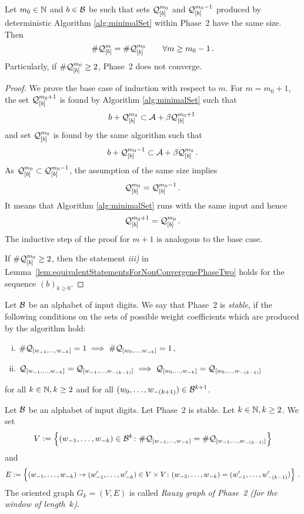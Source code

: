 \begin{thm}
\label{thm:bbbCondition}
Let $m_0 \in \NN$ and $b\in\B$ be such that sets $\Qb{m_0}$ and $\Qb{m_0-1}$ produced by deterministic Algorithm \ref{alg:minimalSet} within Phase~2 have the same size. Then
$$
    \#\Qb{m} = \#\Qb{m_0} \qquad \forall m\geq m_0-1\,.
$$ 
Particularly, if $\#\Qb{m_0}\geq 2$, Phase~2 does not converge.
\end{thm}
\begin{proof}
We prove the base case of induction with respect to $m$. For $m=m_0+1$, the set $\Qb{m_0+1}$ is found by Algorithm \ref{alg:minimalSet} such that 
$$
b + \Qb{m_0} \subset \A + \beta \Qb{m_0+1}\,
$$
and set $\Qb{m_0}$ is found by the same algorithm such that
$$
b + \Qb{m_0-1} \subset \A + \beta \Qb{m_0}\,.
$$
As $\Qb{m_0} \subset \Qb{m_0-1}$, the assumption of the same size implies
$$
    \Qb{m_0} = \Qb{m_0-1}\,.
$$
It means that Algorithm \ref{alg:minimalSet} runs with the same input and hence
$$
\Qb{m_0+1}=\Qb{m_0}\,.
$$
The inductive step of the proof for $m+1$ is analogous to the base case.

If $\#\Qb{m_0}\geq 2$, then the statement \textit{iii)} in Lemma~\ref{lem:equivalentStatementsForNonConvergenePhaseTwo} holds for the sequence $(b)_{k\geq 0}$.
\end{proof}





\begin{defn}
Let $\B$ be an alphabet of input digits. We say that Phase~2 is \emph{stable}, if the following conditions on the sets of possible weight coefficients which are produced by the algorithm hold: 
\begin{enumerate}[i)]
	\item $\#\Qw{1}{k}=1 \implies \#\Qwo{k}=1$,
	\item $\Qw{1}{k}=\Qw{1}{(k-1)} \implies \Qwo{k}=\Qwo{(k-1)}$
\end{enumerate}
for all $k\in\NN, k\geq 2$ and for all $\tupleo{(k+1)} \in \B^{k+1}$.
\end{defn}


\begin{defn}
Let $\B$ be an alphabet of input digits. Let Phase~2 is stable. Let $k\in\NN, k\geq 2$. We set
$$
V:=\left\{\tuple{1}{k}\in\B^k \colon \#\Qw{1}{k}=\#\Qw{1}{(k-1)}\right\}
$$
and
$$
E:=\left\{\tuple{1}{k}\rightarrow\tuple[w']{1}{k}\in V\times V \colon \tuple{2}{k}=\tuple[w']{1}{(k-1)}\right\}\,.
$$
The oriented graph $G_k=(V,E)$ is called \emph{Rauzy graph of Phase~2 (for the window of length~$k$)}.
\end{defn}

